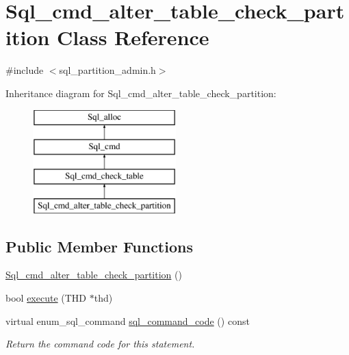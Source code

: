 \hypertarget{classSql__cmd__alter__table__check__partition}{}\section{Sql\+\_\+cmd\+\_\+alter\+\_\+table\+\_\+check\+\_\+partition Class Reference}
\label{classSql__cmd__alter__table__check__partition}


{\ttfamily \#include $<$sql\+\_\+partition\+\_\+admin.\+h$>$}

Inheritance diagram for Sql\+\_\+cmd\+\_\+alter\+\_\+table\+\_\+check\+\_\+partition\+:\begin{figure}[H]
\begin{center}
\leavevmode
\includegraphics[height=4.000000cm]{classSql__cmd__alter__table__check__partition}
\end{center}
\end{figure}
\subsection*{Public Member Functions}
\begin{DoxyCompactItemize}
\item 
\mbox{\hyperlink{classSql__cmd__alter__table__check__partition_a5ed33978bd001a0bf1349aae8d4458cb}{Sql\+\_\+cmd\+\_\+alter\+\_\+table\+\_\+check\+\_\+partition}} ()
\item 
bool \mbox{\hyperlink{classSql__cmd__alter__table__check__partition_a8966c4ecbcc51851144d89eebe38b4d4}{execute}} (T\+HD $\ast$thd)
\item 
\mbox{\label{classSql__cmd__alter__table__check__partition_adfcb3ba12389c7d2b1fb1a29cb9049bf}} 
virtual enum\+\_\+sql\+\_\+command \mbox{\hyperlink{classSql__cmd__alter__table__check__partition_adfcb3ba12389c7d2b1fb1a29cb9049bf}{sql\+\_\+command\+\_\+code}} () const
\begin{DoxyCompactList}\small\item\em Return the command code for this statement. \end{DoxyCompactList}\end{DoxyCompactItemize}
